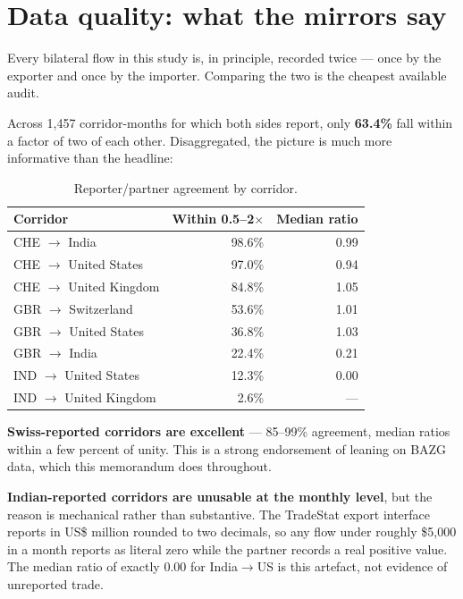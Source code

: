 \documentclass[11pt,a4paper]{article}
\begin{document}
\section{Data quality: what the mirrors say}

Every bilateral flow in this study is, in principle, recorded twice --- once by the exporter and
once by the importer. Comparing the two is the cheapest available audit.

Across 1{,}457 corridor-months for which both sides report, only \textbf{63.4\%} fall within a
factor of two of each other. Disaggregated, the picture is much more informative than the
headline:

\begin{table}[h]
\centering
\begin{tabular}{@{}lrr@{}}
\toprule
\textbf{Corridor} & \textbf{Within 0.5--2$\times$} & \textbf{Median ratio} \\
\midrule
CHE $\to$ India & 98.6\% & 0.99 \\
CHE $\to$ United States & 97.0\% & 0.94 \\
CHE $\to$ United Kingdom & 84.8\% & 1.05 \\
GBR $\to$ Switzerland & 53.6\% & 1.01 \\
GBR $\to$ United States & 36.8\% & 1.03 \\
GBR $\to$ India & 22.4\% & 0.21 \\
IND $\to$ United States & 12.3\% & 0.00 \\
IND $\to$ United Kingdom & 2.6\% & --- \\
\bottomrule
\end{tabular}
\caption{Reporter/partner agreement by corridor.}
\end{table}

\textbf{Swiss-reported corridors are excellent} --- 85--99\% agreement, median ratios within a
few percent of unity. This is a strong endorsement of leaning on BAZG data, which this
memorandum does throughout.

\textbf{Indian-reported corridors are unusable at the monthly level}, but the reason is
mechanical rather than substantive. The TradeStat export interface reports in US\$ million
rounded to two decimals, so any flow under roughly \$5{,}000 in a month reports as literal zero
while the partner records a real positive value. The median ratio of exactly 0.00 for
India$\to$US is this artefact, not evidence of unreported trade.
\end{document}

